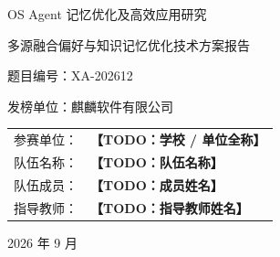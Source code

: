 \documentclass[zihao=-4,a4paper]{ctexart}
\newcommand{\todo}[1]{\textcolor{todored}{\textbf{【TODO：#1】}}}
\begin{document}
\begin{titlepage}
  \centering
  \vspace*{20mm}
  {\heiti{} OS Agent 记忆优化及高效应用研究\par}
  \vspace{8mm}
  { 多源融合偏好与知识记忆优化技术方案报告\par}
  \vspace{6mm}
  { 题目编号：XA-202612\par}
  \vspace{4mm}
  { 发榜单位：麒麟软件有限公司\par}
  \vspace{22mm}
  \begin{tabular}{rl}
    参赛单位： & \todo{学校 / 单位全称} \\
    队伍名称： & \todo{队伍名称}         \\
    队伍成员： & \todo{成员姓名}         \\
    指导教师： & \todo{指导教师姓名}     \\
  \end{tabular}
  \vfill
  { 2026 年 9 月\par}
  \vspace*{8mm}
\end{titlepage}

\tableofcontents
\newpage










\end{document}
